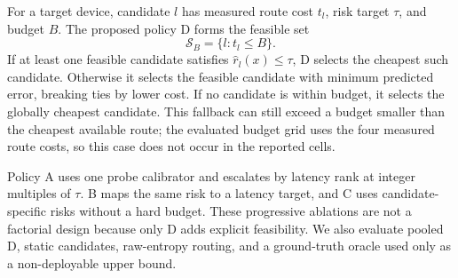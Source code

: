 \documentclass[a4paper,review,12pt]{elsarticle}
\begin{document}
For a target device, candidate $l$ has measured route cost $t_l$, risk target $\tau$, and budget $B$. The proposed policy D forms the feasible set
\begin{equation}
\mathcal{S}_B=\{l:t_l\leq B\}.
\label{eq:feasible}
\end{equation}
If at least one feasible candidate satisfies $\widehat{r}_l(x)\leq\tau$, D selects the cheapest such candidate. Otherwise it selects the feasible candidate with minimum predicted error, breaking ties by lower cost. If no candidate is within budget, it selects the globally cheapest candidate. This fallback can still exceed a budget smaller than the cheapest available route; the evaluated budget grid uses the four measured route costs, so this case does not occur in the reported cells.

Policy A uses one probe calibrator and escalates by latency rank at integer multiples of $\tau$. B maps the same risk to a latency target, and C uses candidate-specific risks without a hard budget. These progressive ablations are not a factorial design because only D adds explicit feasibility. We also evaluate pooled D, static candidates, raw-entropy routing, and a ground-truth oracle used only as a non-deployable upper bound.

\begin{table}[H]
\centering
\caption{Routing-policy roles and information access. ``Per condition'' means that the deployment domain is configured before inference; pooled D removes that requirement. The oracle uses held-out ground truth and is not deployable.}
\label{tab:policy-summary}
\small
{}
\end{table}
\end{document}

